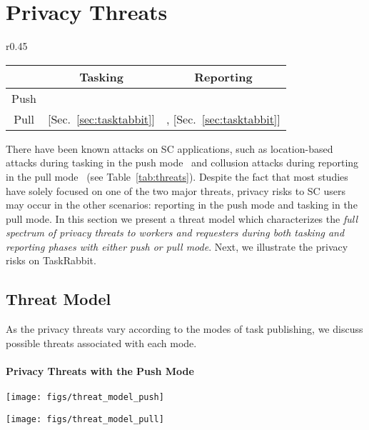\documentclass{USC-Thesis}
\numberwithin{equation}{chapter}
\begin{document}
\section{Privacy Threats}

\begin{wraptable}{r}{0.45\textwidth}
\caption{Attacks on SC users.}
\begin{center}
\begin{tabular}{ | c | c | c | } 
\hline
					& Tasking 				& Reporting \\
\hline
Push 	& \cite{kazemi2011privacy} 	& \cite{Shin2011}  \\  
\hline
Pull 	&  	[Sec.~\ref{sec:tasktabbit}]						& \cite{Wang2016,Shin2011}, [Sec.~\ref{sec:tasktabbit}] \\ 
\hline
\end{tabular}
\label{tab:threats}
\end{center}
\end{wraptable}

There have been known attacks on SC applications, such as location-based attacks during tasking in the push mode~\cite{kazemi2011privacy} and collusion attacks during reporting in the pull mode~\cite{Wang2016} (see Table~\ref{tab:threats}). Despite the fact that most studies have solely focused on one of the two major threats, privacy risks to SC users may occur in the other scenarios: reporting in the push mode and tasking in the pull mode.
In this section we present a threat model which characterizes the \emph{full spectrum of privacy threats to workers and requesters during both tasking and reporting phases with either push or pull mode}. Next, we illustrate the privacy risks on TaskRabbit.

\subsection{Threat Model}
\label{sec:threat_model}
As the privacy threats vary according to the modes of task publishing, we discuss possible threats associated with each mode.

\paragraph{\textbf{Privacy Threats with the Push Mode}}

\begin{figure*}[ht]
	\begin{minipage}[b]{0.48\linewidth}
		\centering
		\texttt{[image: figs/threat\_model\_push]}
		\label{fig:threat_model_push}
	\end{minipage}
	\hspace{4pt}
	\begin{minipage}[b]{.48\linewidth}
		\centering
		\texttt{[image: figs/threat\_model\_pull]}
		\label{fig:threat_model_pull}
	\end{minipage}
	\caption{Threat models in spatial crowdsourcing.}
	\label{fig:threat_model}
\end{figure*}
\end{document}
